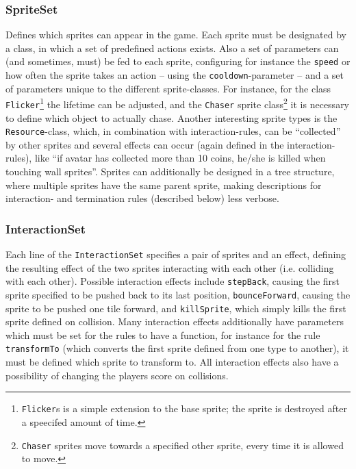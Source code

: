\documentclass[a4paper,titlepage,final]{report}
\begin{document}
\subsubsection*{SpriteSet}
Defines which sprites can appear in the game. Each sprite must be designated by a class, in which a set of predefined actions exists. Also a set of parameters can (and sometimes, must) be fed to each sprite, configuring for instance the \texttt{speed} or how often the sprite takes an action -- using the \texttt{cooldown}-parameter -- and a set of parameters unique to the different sprite-classes.
For instance, for the  class \texttt{Flicker}\footnote{\texttt{Flicker}s is a simple extension to the base sprite; the sprite is destroyed after a speecifed amount of time.} the lifetime can be adjusted, and the \texttt{Chaser} sprite class\footnote{\texttt{Chaser} sprites move towards a specified other sprite, every time it is allowed to move.} it is necessary to define which object to actually chase.
Another interesting sprite types is the \texttt{Resource}-class, which, in combination with interaction-rules, can be ``collected'' by other sprites and several effects can occur (again defined in the interaction-rules), like ``if avatar has collected more than 10 coins, he/she is killed when touching wall sprites''.
Sprites can additionally be designed in a tree structure, where multiple sprites have the same parent sprite, making descriptions for interaction- and termination rules (described below) less verbose. 

\subsubsection*{InteractionSet}
Each line of the \texttt{InteractionSet} specifies a pair of sprites and an effect, defining the resulting effect of the two sprites interacting with each other (i.e. colliding with each other).
Possible interaction effects include \texttt{stepBack}, causing the first sprite specified to be pushed back to its last position, \texttt{bounceForward}, causing the sprite to be pushed one tile forward, and \texttt{killSprite}, which simply kills the first sprite defined on collision.
Many interaction effects additionally have parameters which must be set for the rules to have a function, for instance for the rule \texttt{transformTo} (which converts the first sprite defined from one type to another), it must be defined which sprite to transform to.
All interaction effects also have a possibility of changing the players score on collisions.
\end{document}
